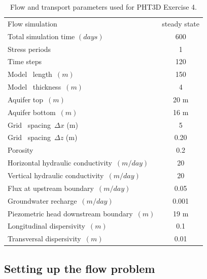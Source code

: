 \begin{table}
\caption{Flow and transport parameters used for PHT3D Exercise 4.}
\begin{center}
\begin{tabular}{lc} \hline
Flow simulation                     & steady state \\
Total simulation time $(days)$       & 600 \\
Stress periods                       & 1 \\
Time steps           & 120 \\
Model \  length\     $ (m)                $         &  150            \\
Model \  thickness\  $ (m)                $         &  4            \\
Aquifer top\               $(m)        $         &  20 m          \\
Aquifer bottom\            $(m)        $         &  16 m          \\
Grid \ spacing\      $\Delta x $ (m)                &    5            \\
Grid \ spacing\      $\Delta z $ (m)                &    0.20         \\
Porosity\            $            $         &  0.2           \\
Horizontal hydraulic conductivity\ $(m/day)           $         & 20         \\ 
Vertical   hydraulic conductivity\ $ (m/day)           $         & 20       \\ 
Flux at upstream boundary\ $(m/day)          $         &  0.05          \\ 
Groundwater recharge\ $(m/day)          $         &  0.001          \\ 
Piezometric head downstream boundary\ $(m)        $         &  19 m          \\ 
Longitudinal dispersivity\ $(m)         $         &  0.1          \\  
Transversal  dispersivity\ $(m)         $         &  0.01          \\ \hline

\end{tabular}
\label{edenhill_flow}
\end{center}
\end{table}

\subsection[Setting up the flow problem]{Setting up the flow problem}

